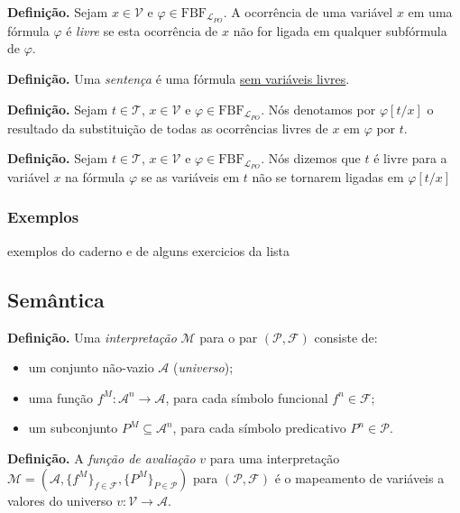         \textbf{Definição.} Sejam $x \in \mathcal{V}$ e $\varphi \in \text{FBF}_{\mathcal{L}_{PO}}$. A ocorrência de uma variável $x$ em uma fórmula $\varphi$ é \textit{livre} se esta ocorrência de $x$ não for ligada em qualquer subfórmula de $\varphi$. 
        
        \textbf{Definição.} Uma \textit{sentença} é uma fórmula \underline{sem variáveis livres}. 
        
        \textbf{Definição.} Sejam $t \in \mathcal{T}$, $x \in \mathcal{V}$ e $\varphi \in \text{FBF}_{\mathcal{L}_{PO}}$. Nós denotamos por $\varphi[t/x]$ o resultado da substituição de todas as ocorrências livres de $x$ em $\varphi$ por $t$. 
        
        \textbf{Definição.} Sejam $t \in \mathcal{T}$, $x \in \mathcal{V}$ e $\varphi \in \text{FBF}_{\mathcal{L}_{PO}}$. Nós dizemos que $t$ é livre para a variável $x$ na fórmula $\varphi$ se as variáveis em $t$ não se tornarem ligadas em $\varphi[t/x]$  

        \subsubsection*{Exemplos}
            exemplos do caderno e de alguns exercicios da lista
    
    \subsection{Semântica}
        
        \textbf{Definição.} Uma \textit{interpretação} $\mathcal{M}$ para o par $(\mathcal{P}, \mathcal{F})$ consiste de:
        \begin{itemize}[left=0.5cm, align=left, nosep]
            \item um conjunto não-vazio $\mathcal{A}$ (\textit{universo});
            \item uma função $f^M : \mathcal{A}^n \to \mathcal{A}$, para cada símbolo funcional $f^n \in \mathcal{F}$;
            \item um subconjunto $P^M \subseteq \mathcal{A}^n$, para cada símbolo predicativo $P^n \in \mathcal{P}$.
        \end{itemize}

        \textbf{Definição.} A \textit{função de avaliação} $v$ para uma interpretação $\mathcal{M} = (\mathcal{A}, \{f^M\}_{f \in \mathcal{F}}, \{P^M\}_{P \in \mathcal{P}})$ para $(\mathcal{P}, \mathcal{F})$ é o mapeamento de variáveis a valores do universo $v : \mathcal{V} \rightarrow \mathcal{A}$.

